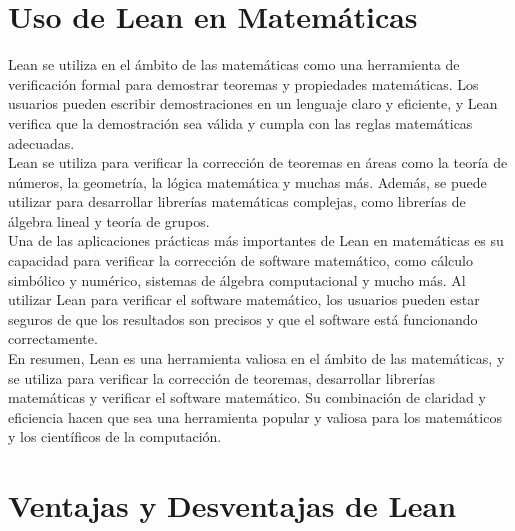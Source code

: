 \documentclass{article}
\begin{document}
\section{Uso de Lean en Matemáticas}
Lean se utiliza en el ámbito de las matemáticas como una herramienta de
verificación formal para demostrar teoremas y propiedades matemáticas. Los
usuarios pueden escribir demostraciones en un lenguaje claro y eficiente,
y Lean verifica que la demostración sea válida y cumpla con las reglas
matemáticas adecuadas.\\

Lean se utiliza para verificar la corrección de teoremas en áreas como la
teoría de números, la geometría, la lógica matemática y muchas más.
Además, se puede utilizar para desarrollar librerías matemáticas
complejas, como librerías de álgebra lineal y teoría de grupos.\\

Una de las aplicaciones prácticas más importantes de Lean en matemáticas
es su capacidad para verificar la corrección de software matemático, como
cálculo simbólico y numérico, sistemas de álgebra computacional y mucho
más. Al utilizar Lean para verificar el software matemático, los usuarios
pueden estar seguros de que los resultados son precisos y que el software
está funcionando correctamente.\\

En resumen, Lean es una herramienta valiosa en el ámbito de las
matemáticas, y se utiliza para verificar la corrección de teoremas,
desarrollar librerías matemáticas y verificar el software matemático. Su
combinación de claridad y eficiencia hacen que sea una herramienta popular
y valiosa para los matemáticos y los científicos de la computación.

\section{Ventajas y Desventajas de Lean}
\end{document}
